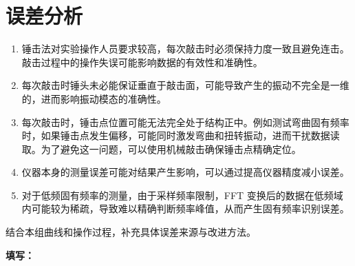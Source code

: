 \documentclass[UTF8,a4paper,12pt]{ctexart}
\newcommand{\blank}[1][2.5cm]{\mbox{\underline{\hspace{#1}}}}
\newcommand{\answer}{\par\noindent\textbf{填写：}\blank[0.86\textwidth]\par}
\numberwithin{equation}{section}
\begin{document}
\section{误差分析}
\begin{enumerate}
  \item 锤击法对实验操作人员要求较高，每次敲击时必须保持力度一致且避免连击。敲击过程中的操作失误可能影响数据的有效性和准确性。
  \item 每次敲击时锤头未必能保证垂直于敲击面，可能导致产生的振动不完全是一维的，进而影响振动模态的准确性。
  \item 每次敲击时，锤击点位置可能无法完全处于结构正中。例如测试弯曲固有频率时，如果锤击点发生偏移，可能同时激发弯曲和扭转振动，进而干扰数据读取。为了避免这一问题，可以使用机械敲击确保锤击点精确定位。
  \item 仪器本身的测量误差可能对结果产生影响，可以通过提高仪器精度减小误差。
  \item 对于低频固有频率的测量，由于采样频率限制，FFT 变换后的数据在低频域内可能较为稀疏，导致难以精确判断频率峰值，从而产生固有频率识别误差。
\end{enumerate}
结合本组曲线和操作过程，补充具体误差来源与改进方法。
\answer
\end{document}
